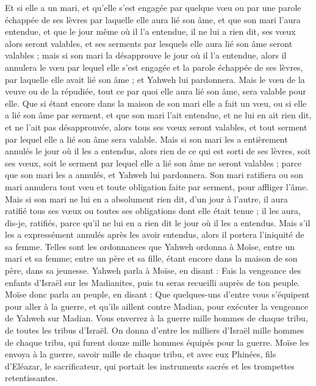 \begin{multicols}{2}
Et si elle a un mari, et qu'elle s'est engagée par quelque vœu ou par une parole échappée de ses lèvres par laquelle elle aura lié son âme,
et que son mari l'aura entendue, et que le jour même où il l'a entendue, il ne lui a rien dit, ses vœux alors seront valables, et ses serments par lesquels elle aura lié son âme seront valables ;
mais si son mari la désapprouve le jour où il l'a entendue, alors il annulera le vœu par lequel elle s'est engagée et la parole échappée de ses lèvres, par laquelle elle avait lié son âme ; et Yahweh lui pardonnera.
Mais le vœu de la veuve ou de la répudiée, tout ce par quoi elle aura lié son âme, sera valable pour elle.
Que si étant encore dans la maison de son mari elle a fait un vœu, ou si elle a lié son âme par serment,
et que son mari l'ait entendue, et ne lui en ait rien dit, et ne l'ait pas désapprouvée, alors tous ses vœux seront valables, et tout serment par lequel elle a lié son âme sera valable.
Mais si son mari les a entièrement annulés le jour où il les a entendus, alors rien de ce qui est sorti de ses lèvres, soit ses vœux, soit le serment par lequel elle a lié son âme ne seront valables ; parce que son mari les a annulés, et Yahweh lui pardonnera.
Son mari ratifiera ou son mari annulera tout vœu et toute obligation faite par serment, pour affliger l'âme.
Mais si son mari ne lui en a absolument rien dit, d'un jour à l'autre, il aura ratifié tous ses vœux ou toutes ses obligations dont elle était tenue ; il les aura, dis-je, ratifiés, parce qu'il ne lui en a rien dit le jour où il les a entendus.
Mais s'il les a expressément annulés après les avoir entendus, alors il portera l'iniquité de sa femme.
Telles sont les ordonnances que Yahweh ordonna à Moïse, entre un mari et sa femme; entre un père et sa fille, étant encore dans la maison de son père, dans sa jeunesse.
\VerseOne{}Yahweh parla à Moïse, en disant :
Fais la vengeance des enfants d'Israël sur les Madianites, puis tu seras recueilli auprès de ton peuple.
Moïse donc parla au peuple, en disant : Que quelques-uns d'entre vous s'équipent pour aller à la guerre, et qu'ils aillent contre Madian, pour exécuter la vengeance de Yahweh sur Madian.
Vous enverrez à la guerre mille hommes de chaque tribu, de toutes les tribus d'Israël.
On donna d'entre les milliers d'Israël mille hommes de chaque tribu, qui furent douze mille hommes équipés pour la guerre.
Moïse les envoya à la guerre, savoir mille de chaque tribu, et avec eux Phinées, fils d'Eléazar, le sacrificateur, qui portait les instruments sacrés et les trompettes retentissantes.

\end{multicols}

